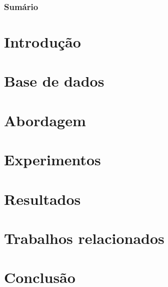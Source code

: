 \documentclass{beamer}
\begin{document}
\begin{frame}[label=firstframe]
    \titlepage
\end{frame}

\begin{frame}
    \frametitle{Sumário}
    \tableofcontents
\end{frame}

\section{Introdução}


\section{Base de dados}


\section{Abordagem}


\section{Experimentos}


\section{Resultados}


\section{Trabalhos relacionados}


\section{Conclusão}

\end{document}
